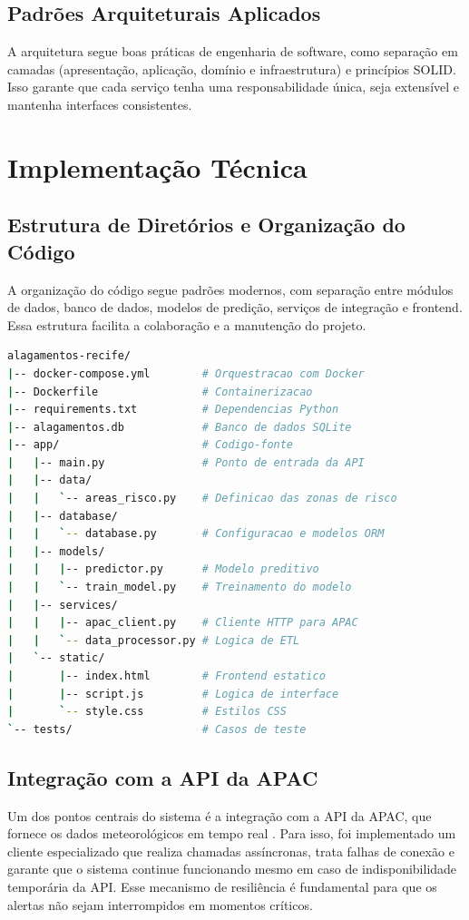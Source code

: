 \subsection{Padrões Arquiteturais Aplicados}

A arquitetura segue boas práticas de engenharia de software, como separação em camadas (apresentação, aplicação, domínio e infraestrutura) e princípios SOLID. Isso garante que cada serviço tenha uma responsabilidade única, seja extensível e mantenha interfaces consistentes.

\section{Implementação Técnica}

\subsection{Estrutura de Diretórios e Organização do Código}

A organização do código segue padrões modernos, com separação entre módulos de dados, banco de dados, modelos de predição, serviços de integração e frontend. Essa estrutura facilita a colaboração e a manutenção do projeto.

\begin{lstlisting}[language=bash,caption={Estrutura de Diretórios do Projeto},label={cod:estrutura}]
alagamentos-recife/
|-- docker-compose.yml        # Orquestracao com Docker
|-- Dockerfile                # Containerizacao
|-- requirements.txt          # Dependencias Python
|-- alagamentos.db            # Banco de dados SQLite
|-- app/                      # Codigo-fonte
|   |-- main.py               # Ponto de entrada da API
|   |-- data/
|   |   `-- areas_risco.py    # Definicao das zonas de risco
|   |-- database/
|   |   `-- database.py       # Configuracao e modelos ORM
|   |-- models/
|   |   |-- predictor.py      # Modelo preditivo
|   |   `-- train_model.py    # Treinamento do modelo
|   |-- services/
|   |   |-- apac_client.py    # Cliente HTTP para APAC
|   |   `-- data_processor.py # Logica de ETL
|   `-- static/
|       |-- index.html        # Frontend estatico
|       |-- script.js         # Logica de interface
|       `-- style.css         # Estilos CSS
`-- tests/                    # Casos de teste
\end{lstlisting}

\subsection{Integração com a API da APAC}

Um dos pontos centrais do sistema é a integração com a API da APAC, que fornece os dados meteorológicos em tempo real \cite{alves_apac}. Para isso, foi implementado um cliente especializado que realiza chamadas assíncronas, trata falhas de conexão e garante que o sistema continue funcionando mesmo em caso de indisponibilidade temporária da API. Esse mecanismo de resiliência é fundamental para que os alertas não sejam interrompidos em momentos críticos.
